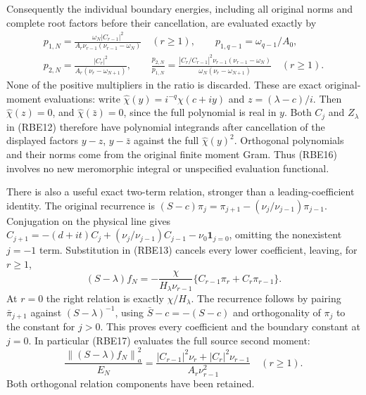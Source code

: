\documentclass[11pt,a4paper]{article}
\providecommand{\norm}[1]{\left\lVert#1\right\rVert}
\begin{document}
Consequently the individual boundary energies, including all
original norms and complete root factors before their cancellation,
are evaluated exactly by
\begin{equation}\tag{RBE16}
 \begin{gathered}
 p_{1,N}=\frac{\omega_N|C_{r-1}|^2}
 {A_r\nu_{r-1}(\nu_{r-1}-\omega_N)}\quad(r\ge1),\qquad
 p_{1,q-1}=\omega_{q-1}/A_0,\\
 p_{2,N}=\frac{|C_r|^2}{A_r(\nu_r-\omega_{N+1})},\qquad
 \frac{p_{2,N}}{p_{1,N}}
 =\frac{|C_r/C_{r-1}|^2\nu_{r-1}(\nu_{r-1}-\omega_N)}
 {\omega_N(\nu_r-\omega_{N+1})}\quad(r\ge1).
 \end{gathered}
\end{equation}
None of the positive multipliers in the ratio is discarded.
These are exact original-moment evaluations: write
\(\widehat\chi(y)=i^{-q}\chi(c+iy)\) and
\(z=(\lambda-c)/i\). Then \(\widehat\chi(z)=0\), and
\(\widehat\chi(\bar z)=0\), since the full polynomial is
real in \(y\). Both \(C_j\) and \(Z_\lambda\) in (RBE12)
therefore have polynomial integrands after cancellation of the
displayed factors \(y-z\), \(y-\bar z\) against the full
\(\widehat\chi(y)^2\). Orthogonal polynomials and their norms
come from the original finite moment Gram. Thus (RBE16) involves
no new meromorphic integral or unspecified evaluation functional.

There is also a useful exact two-term relation, stronger than a
leading-coefficient identity. The original recurrence is
\((S-c)\pi_j=\pi_{j+1}-(\nu_j/\nu_{j-1})\pi_{j-1}\).
Conjugation on the physical line gives
\(C_{j+1}=-(d+it)C_j+(\nu_j/\nu_{j-1})C_{j-1}
-\nu_0\mathbf1_{j=0}\), omitting the nonexistent \(j=-1\)
term. Substitution in (RBE13) cancels every lower coefficient,
leaving, for \(r\ge1\),
\begin{equation}\tag{RBE17}
 (S-\lambda)f_N
 =-\frac{\chi}{H_\lambda\nu_{r-1}}
        \{C_{r-1}\pi_r+C_r\pi_{r-1}\}.
\end{equation}
At \(r=0\) the right relation is exactly \(\chi/H_\lambda\).
The recurrence follows by pairing \(\bar\pi_{j+1}\) against
\((S-\lambda)^{-1}\), using \(\bar S-c=-(S-c)\) and
orthogonality of \(\pi_j\) to the constant for \(j>0\).
This proves every coefficient and the boundary constant at \(j=0\).
In particular (RBE17) evaluates the full source second moment:
\begin{equation}\tag{RBE18}
 \frac{\norm{(S-\lambda)f_N}_a^2}{E_N}
 =\frac{|C_{r-1}|^2\nu_r+|C_r|^2\nu_{r-1}}
        {A_r\nu_{r-1}^2}\quad(r\ge1).
\end{equation}
Both orthogonal relation components have been retained.
\end{document}
